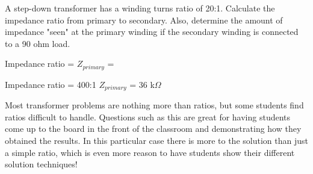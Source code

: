 

A step-down transformer has a winding turns ratio of 20:1.  Calculate the impedance ratio from primary to secondary.  Also, determine the amount of impedance "seen" at the primary winding if the secondary winding is connected to a 90 ohm load.

\vskip 10pt

Impedance ratio = \hskip 80pt $Z_{primary}$ =

\vskip 10pt







Impedance ratio = 400:1 \hskip 80pt $Z_{primary}$ = 36 k$\Omega$







Most transformer problems are nothing more than ratios, but some students find ratios difficult to handle.  Questions such as this are great for having students come up to the board in the front of the classroom and demonstrating how they obtained the results.  In this particular case there is more to the solution than just a simple ratio, which is even more reason to have students show their different solution techniques!





